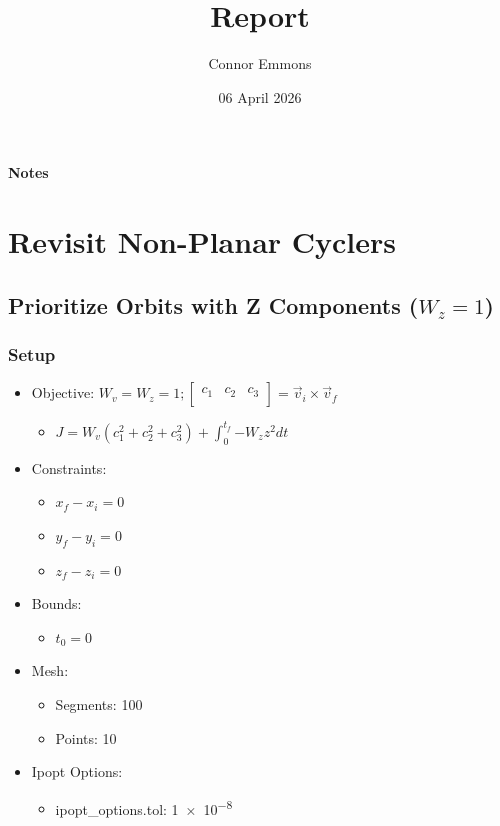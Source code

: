 \documentclass{article}
\title{Report}
\date{06 April 2026}
\author{Connor Emmons}
\begin{document}
\maketitle
\vfill
\paragraph*{Notes}

\newpage
{}

\tableofcontents

\newpage

\section{Revisit Non-Planar Cyclers}

\subsection{Prioritize Orbits with Z Components ($W_z = 1$)}

\subsubsection{Setup}

\begin{itemize}
    \item Objective: $W_v = W_z = 1; \left[\begin{matrix}c_1&c_2&c_3\\\end{matrix}\right] = \vec{v}_i\times\vec{v}_f$
    \begin{itemize}
        \item $J = W_v\left(c_1^2 + c_2^2 + c_3^2\right) + \int_{0}^{t_f}{-W_zz^2dt}$
    \end{itemize}
    \item Constraints:
    \begin{itemize}
        \item $x_f - x_i = 0$
        \item $y_f - y_i = 0$
        \item $z_f - z_i = 0$
    \end{itemize}
    \item Bounds:
    \begin{itemize}
        \item $t_0 = 0$
    \end{itemize}
    \item Mesh:
    \begin{itemize}
        \item Segments: 100
        \item Points: 10
    \end{itemize}
    \item Ipopt Options:
    \begin{itemize}
        \item ipopt\_options.tol: \num{1e-8}
    \end{itemize}
\end{itemize}
\end{document}
